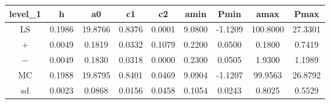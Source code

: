 \begin{table}
\begin{tabular}{ccccccccc}
\hline \hline
level_1 & h & a0 & c1 & c2 & amin & Pmin & amax & Pmax \\
\hline
LS & 0.1986 & 19.8766 & 0.8376 & 0.0001 & 9.0800 & -1.1209 & 100.8000 & 27.3301 \\
$ + $ & 0.0049 & 0.1819 & 0.0332 & 0.1079 & 0.2200 & 0.0500 & 0.1800 & 0.7419 \\
$ - $ & 0.0049 & 0.1830 & 0.0318 & 0.0000 & 0.2300 & 0.0505 & 1.9300 & 1.1989 \\
MC & 0.1988 & 19.8795 & 0.8401 & 0.0469 & 9.0904 & -1.1207 & 99.9563 & 26.8792 \\
sd & 0.0023 & 0.0868 & 0.0156 & 0.0458 & 0.1054 & 0.0243 & 0.8025 & 0.5529 \\
\hline
\end{tabular}
\end{table}
